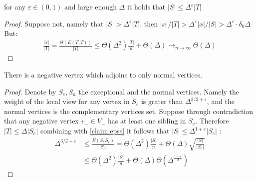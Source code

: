 \begin{claim}
  \label{claim:epss}
  for any $\varepsilon \in \left( 0,1 \right)$ and large enough $\Delta$  it holds that $ |S| \le \Delta^{\varepsilon}|T| $ 
\end{claim}
\begin{proof}
  Suppose not, namely that $|S| > \Delta^{\varepsilon}|T|$, then $|x|/|T| > \Delta^{\varepsilon}|x|/|S| > \Delta^{\varepsilon} \cdot \delta_{0}\Delta $ But:  
\begin{equation*}
  \begin{split}
    \frac{|x|}{|T|} = \frac{\Theta \left(E(T,T) \right)}{|T|} \le \Theta(\Delta^{2})\frac{|T|}{n}  + \Theta(\Delta)  \rightarrow_{n\rightarrow \infty} \Theta(\Delta)
  \end{split}
\end{equation*}
\end{proof}

\begin{claim}
  There is a negative vertex which adjoins to only normal vertices. 
\end{claim}
\begin{proof}
  Denote by $S_{e},S_{n}$ the exceptional and the normal vertices. Namely the weight of the local view for any vertex in $S_{e}$ is grater than $\Delta^{3/2 + \varepsilon}$, and the normal vertices is the complementary vertices set. Suppose through contradiction that any negative vertex $v_{-}\in V_{-}$ has at least one sibling in $S_{e}$. Therefore $|T| \le \Delta |S_{e}|$ combining with \cref{claim:epss} it follows that $|S| \le \Delta^{1+\varepsilon}|S_{e}|$ : 
  \begin{equation*}
    \begin{split}
      \Delta^{3/2 + \varepsilon} & \le \frac{E(S,S_{e})}{|S_{e}|} = \Theta\left( \Delta^{2} \right)\frac{|S|}{n} + \Theta\left( \Delta \right)\sqrt{ \frac{|S|}{|S_{e}|}  }\\ 
      & \le \Theta(\Delta^{2}) \frac{|S|}{n} + \Theta(\Delta) \Theta\left( \Delta^{\frac{1+\varepsilon}{2}} \right)  
    \end{split}
  \end{equation*} 
 \end{proof}

